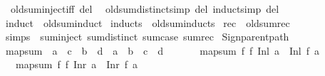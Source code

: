 \begin{isabellebody}
\endisatagML
{\isafoldML}%
%
\isadelimML
%
\endisadelimML
\isanewline
\isanewline
{}\isamarkupfalse%
\isanewline
\ \ old{\isachardot}{\kern0pt}sum{\isachardot}{\kern0pt}inject{\isacharbrackleft}{\kern0pt}iff\ del{\isacharbrackright}{\kern0pt}\isanewline
\ \ old{\isachardot}{\kern0pt}sum{\isachardot}{\kern0pt}distinct{\isacharparenleft}{\kern0pt}{}{\isacharparenright}{\kern0pt}{\isacharbrackleft}{\kern0pt}simp\ del{\isacharcomma}{\kern0pt}\ induct{\isacharunderscore}{\kern0pt}simp\ del{\isacharbrackright}{\kern0pt}\isanewline
\isanewline
{}\isamarkupfalse%
\ induct\ {\isacharequal}{\kern0pt}\ old{\isachardot}{\kern0pt}sum{\isachardot}{\kern0pt}induct\isanewline
{}\isamarkupfalse%
\ inducts\ {\isacharequal}{\kern0pt}\ old{\isachardot}{\kern0pt}sum{\isachardot}{\kern0pt}inducts\isanewline
{}\isamarkupfalse%
\ rec\ {\isacharequal}{\kern0pt}\ old{\isachardot}{\kern0pt}sum{\isachardot}{\kern0pt}rec\isanewline
{}\isamarkupfalse%
\ simps\ {\isacharequal}{\kern0pt}\ sum{\isachardot}{\kern0pt}inject\ sum{\isachardot}{\kern0pt}distinct\ sum{\isachardot}{\kern0pt}case\ sum{\isachardot}{\kern0pt}rec\isanewline
%
\isadelimML
\isanewline
%
\endisadelimML
%
\isatagML
{}\isamarkupfalse%
\ {\isacartoucheopen}Sign{\isachardot}{\kern0pt}parent{\isacharunderscore}{\kern0pt}path{\isacartoucheclose}%
\endisatagML
{\isafoldML}%
%
\isadelimML
\isanewline
%
\endisadelimML
\isanewline
{}\isamarkupfalse%
\ map{\isacharunderscore}{\kern0pt}sum\ {\isacharcolon}{\kern0pt}{\isacharcolon}{\kern0pt}\ {\isachardoublequoteopen}{\isacharparenleft}{\kern0pt}{\isacharprime}{\kern0pt}a\ {\isasymRightarrow}\ {\isacharprime}{\kern0pt}c{\isacharparenright}{\kern0pt}\ {\isasymRightarrow}\ {\isacharparenleft}{\kern0pt}{\isacharprime}{\kern0pt}b\ {\isasymRightarrow}\ {\isacharprime}{\kern0pt}d{\isacharparenright}{\kern0pt}\ {\isasymRightarrow}\ {\isacharprime}{\kern0pt}a\ {\isacharplus}{\kern0pt}\ {\isacharprime}{\kern0pt}b\ {\isasymRightarrow}\ {\isacharprime}{\kern0pt}c\ {\isacharplus}{\kern0pt}\ {\isacharprime}{\kern0pt}d{\isachardoublequoteclose}\isanewline
\ \ \isanewline
\ \ \ \ {\isachardoublequoteopen}map{\isacharunderscore}{\kern0pt}sum\ f{}\ f{}\ {\isacharparenleft}{\kern0pt}Inl\ a{\isacharparenright}{\kern0pt}\ {\isacharequal}{\kern0pt}\ Inl\ {\isacharparenleft}{\kern0pt}f{}\ a{\isacharparenright}{\kern0pt}{\isachardoublequoteclose}\isanewline
\ \ {\isacharbar}{\kern0pt}\ {\isachardoublequoteopen}map{\isacharunderscore}{\kern0pt}sum\ f{}\ f{}\ {\isacharparenleft}{\kern0pt}Inr\ a{\isacharparenright}{\kern0pt}\ {\isacharequal}{\kern0pt}\ Inr\ {\isacharparenleft}{\kern0pt}f{}\ a{\isacharparenright}{\kern0pt}{\isachardoublequoteclose}\isanewline

\end{isabellebody}
